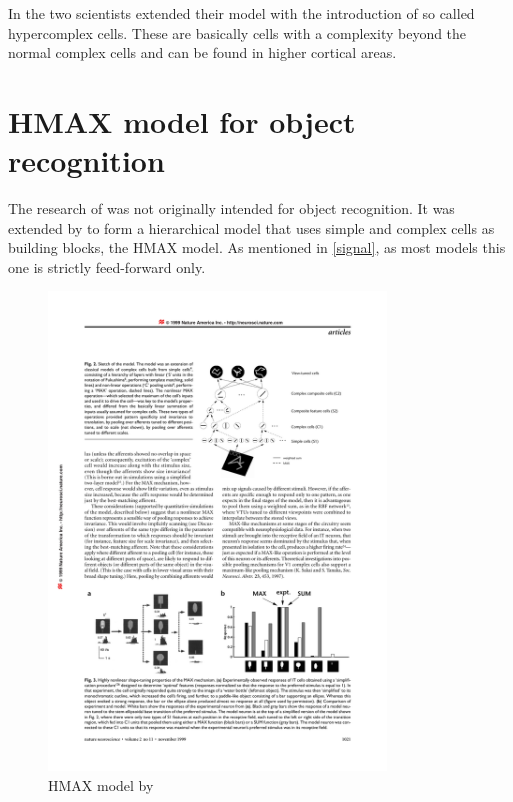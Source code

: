 		In \citep{hubel1965receptive} the two scientists extended their model with the introduction of so called hypercomplex cells. These are basically cells with a complexity beyond the normal complex cells and can be found in higher cortical areas.
		
	\section{HMAX model for object recognition}\label{hmax}
	
		The research of \citeauthor{hubel1962receptive} was not originally intended for object recognition. It was extended by \citeauthor{riesenhuber1999hierarchical} to form a hierarchical model that uses simple and complex cells as building blocks, the HMAX model. As mentioned in \ref{signal}, as most models this one is strictly feed-forward only. 

		\begin{figure}[H]
			\centering
			\includegraphics[width=0.8\textwidth, trim= 9cm 18cm 2.5cm 4cm, clip]{images/riesenhuber-poggio-1999-models-p3.pdf}
			\caption{HMAX model by \citep{riesenhuber1999hierarchical}}
			\label{hmax-model}
		\end{figure}
		

